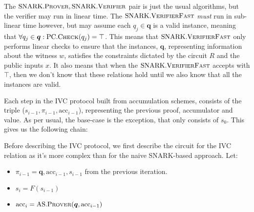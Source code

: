 \documentclass[
]{article}
\providecommand{\tightlist}{%
  \setlength{\itemsep}{0pt}\setlength{\parskip}{0pt}}
\let\origfigure\figure
\let\endorigfigure\endfigure
\renewenvironment{figure}[1][2] {
    \expandafter\origfigure\expandafter[H]
} {
    \endorigfigure
}
\newcommand*\Pc{\mathcal{P}}
\renewcommand{\vec}[1]{ \boldsymbol{#1} }
\newcommand*{\acc}{\mathrm{acc}}
\newcommand*{\Prover}{\mathrm{\text{P\scriptsize ROVER}}}
\newcommand*{\Verifier}{\mathrm{\text{V\scriptsize ERIFIER}}}
\newcommand*{\SNARKProver}{\mathrm{\text{SNARK}}.\Prover}
\newcommand*{\SNARKVerifier}{\mathrm{\text{SNARK}}.\Verifier}
\newcommand*{\SNARKVerifierFast}{\mathrm{\text{SNARK}}.\mathrm{\text{V\scriptsize ERIFIER}\text{F\scriptsize AST}}}
\newcommand*{\IVCProver}{\mathrm{\text{IVC}}.\Prover}
\newcommand*{\AS}{\text{AS}}
\newcommand*{\ASProver}{\AS.\Prover}
\newcommand*{\PC}{\text{PC}}
\newcommand*{\PCCheck}{\PC.\mathrm{\text{C\scriptsize HECK}}}
\begin{document}
The \(\SNARKProver, \SNARKVerifier\) pair is just the usual algorithms,
but the verifier may run in linear time. The \(\SNARKVerifierFast\)
\emph{must} run in sub-linear time however, but may assume each
\(q_j \in \vec{q}\) is a valid instance, meaning that
\(\forall q_j \in \vec{q} : \PCCheck(q_j)
= \top\). This means that \(\SNARKVerifierFast\) only performs linear
checks to ensure that the instances, \(\vec{q}\), representing
information about the witness \(w\), satisfies the constraints dictated
by the circuit \(R\) and the public inputs \(x\). It also means that
when the \(\SNARKVerifierFast\) accepts with \(\top\), then we don't
know that these relations hold until we also know that all the instances
are valid.

Each step in the IVC protocol built from accumulation schemes, consists
of the triple (\(s_{i-1}, \pi_{i-1}, \acc_{i-1}\)), representing the
previous proof, accumulator and value. As per usual, the base-case is
the exception, that only consists of \(s_0\). This gives us the
following chain:

\begin{figure}[!H]
\centering
{}
\caption{
  A visualization of the relationship between $F, \vec{s}, \vec{\pi}$ and
  $\vec{\acc}$ in an IVC setting using Accumulation Schemes. Where $\Pc$ is
  defined to be $\Pc(s_{i-1}, \pi_{i-1}, \acc_{i-1}) = \IVCProver(s_{i-1},
  \pi_{i-1}, \acc_{i-1}) = \pi_i$, $s_i = F(s_{i-1})$, $\acc_i =
  \ASProver(\vec{q}, \acc_{i-1})$.
}
\end{figure}

Before describing the IVC protocol, we first describe the circuit for
the IVC relation as it's more complex than for the naive SNARK-based
approach. Let:

\begin{itemize}
\tightlist
\item
  \(\pi_{i-1} = \vec{q}, \acc_{i-1}, s_{i-1}\) from the previous
  iteration.
\item
  \(s_i = F(s_{i-1})\)
\item
  \(\acc_i = \ASProver(\vec{q}, \acc_{i-1})\)
\end{itemize}
\end{document}
